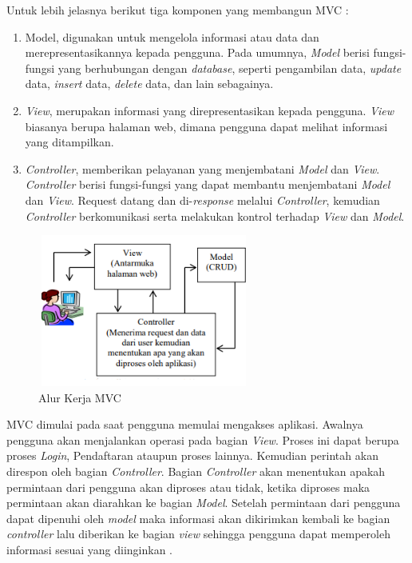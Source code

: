 Untuk lebih jelasnya berikut tiga komponen yang membangun MVC \cite{Wellem} :
\begin{enumerate}
	\item Model, digunakan untuk mengelola informasi atau data dan merepresentasikannya kepada pengguna. Pada umumnya, \textit{Model} berisi fungsi-fungsi yang berhubungan dengan \textit{database}, seperti pengambilan data, \textit{update} data, \textit{insert} data, \textit{delete} data, dan lain sebagainya.
	\item \textit{View}, merupakan informasi yang direpresentasikan kepada pengguna. \textit{View} biasanya berupa halaman web, dimana pengguna dapat melihat informasi yang ditampilkan.
	\item \textit{Controller}, memberikan pelayanan yang menjembatani \textit{Model} dan \textit{View}. \textit{Controller} berisi fungsi-fungsi yang dapat membantu menjembatani \textit{Model} dan \textit{View}. Request datang dan di-\textit{response} melalui \textit{Controller}, kemudian \textit{Controller} berkomunikasi serta melakukan kontrol terhadap \textit{View} dan \textit{Model}.
\end{enumerate}

\begin{figure}[H]
	\centering
	\includegraphics[width=7cm,height=5cm]{gambar/alurmvc}
	\caption{Alur Kerja MVC}
	\label{alurmvc}
\end{figure}

MVC dimulai pada saat pengguna memulai mengakses aplikasi. Awalnya pengguna akan menjalankan operasi pada bagian \textit{View}. Proses ini dapat berupa proses\textit{ Login}, Pendaftaran ataupun proses lainnya. Kemudian perintah akan direspon oleh bagian \textit{Controller}. Bagian\textit{ Controller} akan menentukan apakah permintaan dari pengguna akan diproses atau tidak, ketika diproses maka permintaan akan diarahkan ke bagian\textit{ Model}. Setelah permintaan dari pengguna dapat dipenuhi oleh \textit{model} maka informasi akan dikirimkan kembali ke bagian \textit{controller} lalu diberikan ke bagian \textit{view} sehingga pengguna dapat memperoleh informasi sesuai yang diinginkan \cite{Martono}.

